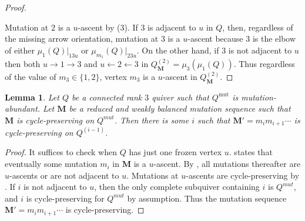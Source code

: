 \documentclass[12pt]{amsart}
\newtheorem{lem}[thm]{Lemma}
\theoremstyle{definition}
\theoremstyle{remark}
\numberwithin{equation}{section}
\newcommand{\mut} {\text{mut}}
\begin{document}
\begin{proof}
\begin{center}
\end{center}

Mutation at $2$ is a $u$-ascent by  (3). 
If $3$ is adjacent to $u$ in $Q$, then, regardless of the missing arrow orientation, mutation at $3$ is a $u$-ascent because $3$ is the elbow of either $\mu_{1}(Q)|_{13u}$ or $\mu_{m_1}(Q)|_{23u}$.
On the other hand, if $3$ is not adjacent to $u$ then both $u \rightarrow 1 \rightarrow 3$ and $u \leftarrow 2 \leftarrow 3$ in $Q_{\mathbf M}^{(2)} = \mu_3(\mu_1(Q))$. 
Thus regardless of the value of $m_3 \in \{1,2\}$, vertex $m_3$ is a $u$-ascent in $Q_{\mathbf M}^{(2)}$.
\end{proof}

\begin{lem}
\label{lem: cycle preserving tail}
Let $Q$ be a connected rank $3$ quiver %
such that $Q^{\mut}$ is mutation-abundant. Let $\mathbf{M}$ be a reduced and weakly balanced mutation sequence such that $\mathbf{M}$ is cycle-preserving on $Q^{mut}$. 
Then there is some $i$ such that $\mathbf{M'} = m_im_{i+1}\cdots$ is cycle-preserving on $Q^{(i-1)}$.
\end{lem}
\begin{proof}
It suffices to check when $Q$ has just one frozen vertex $u$.
 states that eventually some mutation $m_i$ in $\mathbf{M}$ is a $u$-ascent.
By , all mutations thereafter are $u$-ascents or are not adjacent to $u$.
Mutations at $u$-ascents are cycle-preserving by .
If $i$ is not adjacent to $u$, then the only complete subquiver containing $i$ is $Q^{mut}$, and $i$ is cycle-preserving for $Q^{mut}$ by assumption.
Thus the mutation sequence $\mathbf{M'}=m_im_{i+1}\cdots$ is cycle-preserving.
\end{proof}
\end{document}

